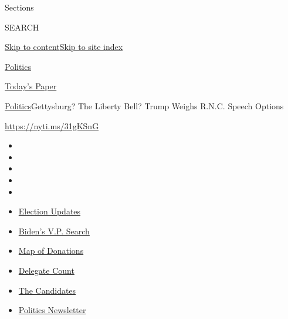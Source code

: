 Sections

SEARCH

\protect\hyperlink{site-content}{Skip to
content}\protect\hyperlink{site-index}{Skip to site index}

\href{https://www.nytimes3xbfgragh.onion/section/politics}{Politics}

\href{https://myaccount.nytimes3xbfgragh.onion/auth/login?response_type=cookie\&client_id=vi}{}

\href{https://www.nytimes3xbfgragh.onion/section/todayspaper}{Today's
Paper}

\href{/section/politics}{Politics}\textbar{}Gettysburg? The Liberty
Bell? Trump Weighs R.N.C. Speech Options

\url{https://nyti.ms/31gKSnG}

\begin{itemize}
\item
\item
\item
\item
\item
\end{itemize}

\begin{itemize}
\item
  \href{https://www.nytimes3xbfgragh.onion/2020/08/03/us/elections/biden-vs-trump.html?action=click\&pgtype=Article\&state=default\&region=TOP_BANNER\&context=storylines_menu}{Election
  Updates}
\item
  \href{https://www.nytimes3xbfgragh.onion/article/biden-vice-president-2020.html?action=click\&pgtype=Article\&state=default\&region=TOP_BANNER\&context=storylines_menu}{Biden's
  V.P. Search}
\item
  \href{https://www.nytimes3xbfgragh.onion/interactive/2020/07/24/us/politics/trump-biden-campaign-donors.html?action=click\&pgtype=Article\&state=default\&region=TOP_BANNER\&context=storylines_menu}{Map
  of Donations}
\item
  \href{https://www.nytimes3xbfgragh.onion/interactive/2020/us/elections/delegate-count-primary-results.html?action=click\&pgtype=Article\&state=default\&region=TOP_BANNER\&context=storylines_menu}{Delegate
  Count}
\item
  \href{https://www.nytimes3xbfgragh.onion/interactive/2019/us/politics/2020-presidential-candidates.html?action=click\&pgtype=Article\&state=default\&region=TOP_BANNER\&context=storylines_menu}{The
  Candidates}
\item
  \href{https://www.nytimes3xbfgragh.onion/newsletters/politics?action=click\&pgtype=Article\&state=default\&region=TOP_BANNER\&context=storylines_menu}{Politics
  Newsletter}
\end{itemize}

